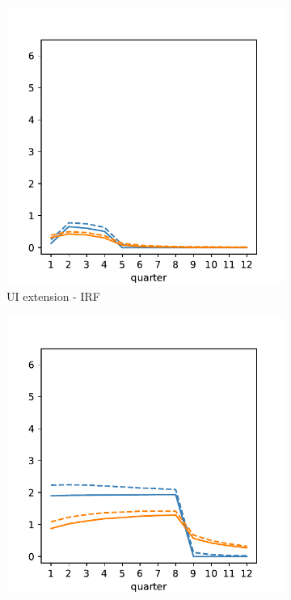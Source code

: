 \begin{figure}[htb]
\begin{subfigure}[b]{.33\linewidth}
		\includegraphics[width=\linewidth]{text/chapter3/Code/HA-Models/FromPandemicCode/Figures/recession_UI_relrecession}
		\caption{UI extension - IRF}
		\label{fig:recessionuirelrecession}
	\end{subfigure}%
	\begin{subfigure}[b]{.33\linewidth}
		\centering
		\includegraphics[width=\linewidth]{text/chapter3/Code/HA-Models/FromPandemicCode/Figures/recession_taxcut_relrecession}

\end{subfigure}
\end{figure}
